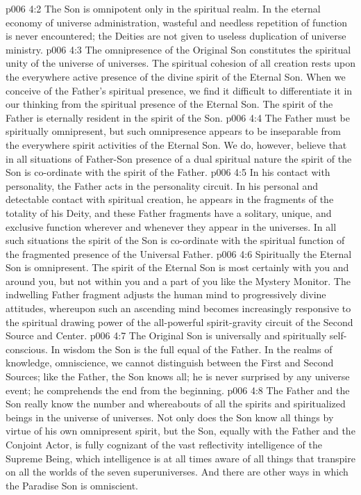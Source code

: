 \vs p006 4:2 \pc The Son is omnipotent only in the spiritual realm. In the eternal economy of universe administration, wasteful and needless repetition of function is never encountered; the Deities are not given to useless duplication of universe ministry.
\vs p006 4:3 \pc The omnipresence of the Original Son constitutes the spiritual unity of the universe of universes. The spiritual cohesion of all creation rests upon the everywhere active presence of the divine spirit of the Eternal Son. When we conceive of the Father’s spiritual presence, we find it difficult to differentiate it in our thinking from the spiritual presence of the Eternal Son. The spirit of the Father is eternally resident in the spirit of the Son.
\vs p006 4:4 The Father must be spiritually omnipresent, but such omnipresence appears to be inseparable from the everywhere spirit activities of the Eternal Son. We do, however, believe that in all situations of Father\hyp{}Son presence of a dual spiritual nature the spirit of the Son is co\hyp{}ordinate with the spirit of the Father.
\vs p006 4:5 In his contact with personality, the Father acts in the personality circuit. In his personal and detectable contact with spiritual creation, he appears in the fragments of the totality of his Deity, and these Father fragments have a solitary, unique, and exclusive function wherever and whenever they appear in the universes. In all such situations the spirit of the Son is co\hyp{}ordinate with the spiritual function of the fragmented presence of the Universal Father.
\vs p006 4:6 Spiritually the Eternal Son is omnipresent. The spirit of the Eternal Son is most certainly with you and around you, but not within you and a part of you like the Mystery Monitor. The indwelling Father fragment adjusts the human mind to progressively divine attitudes, whereupon such an ascending mind becomes increasingly responsive to the spiritual drawing power of the all\hyp{}powerful spirit\hyp{}gravity circuit of the Second Source and Center.
\vs p006 4:7 \pc The Original Son is universally and spiritually self\hyp{}conscious. In wisdom the Son is the full equal of the Father. In the realms of knowledge, omniscience, we cannot distinguish between the First and Second Sources; like the Father, the Son knows all; he is never surprised by any universe event; he comprehends the end from the beginning.
\vs p006 4:8 \pc The Father and the Son really know the number and whereabouts of all the spirits and spiritualized beings in the universe of universes. Not only does the Son know all things by virtue of his own omnipresent spirit, but the Son, equally with the Father and the Conjoint Actor, is fully cognizant of the vast reflectivity intelligence of the Supreme Being, which intelligence is at all times aware of all things that transpire on all the worlds of the seven superuniverses. And there are other ways in which the Paradise Son is omniscient.
